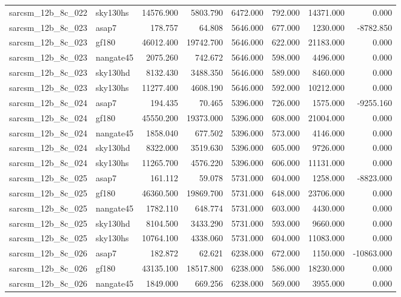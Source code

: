 \begin{tabular}{llrrrrrr}
sarcsm\_12b\_8c\_022 & sky130hs & 14576.900 & 5803.790 & 6472.000 & 792.000 & 14371.000 & 0.000 \\
sarcsm\_12b\_8c\_023 & asap7 & 178.757 & 64.808 & 5646.000 & 677.000 & 1230.000 & -8782.850 \\
sarcsm\_12b\_8c\_023 & gf180 & 46012.400 & 19742.700 & 5646.000 & 622.000 & 21183.000 & 0.000 \\
sarcsm\_12b\_8c\_023 & nangate45 & 2075.260 & 742.672 & 5646.000 & 598.000 & 4496.000 & 0.000 \\
sarcsm\_12b\_8c\_023 & sky130hd & 8132.430 & 3488.350 & 5646.000 & 589.000 & 8460.000 & 0.000 \\
sarcsm\_12b\_8c\_023 & sky130hs & 11277.400 & 4608.190 & 5646.000 & 592.000 & 10212.000 & 0.000 \\
sarcsm\_12b\_8c\_024 & asap7 & 194.435 & 70.465 & 5396.000 & 726.000 & 1575.000 & -9255.160 \\
sarcsm\_12b\_8c\_024 & gf180 & 45550.200 & 19373.000 & 5396.000 & 608.000 & 21004.000 & 0.000 \\
sarcsm\_12b\_8c\_024 & nangate45 & 1858.040 & 677.502 & 5396.000 & 573.000 & 4146.000 & 0.000 \\
sarcsm\_12b\_8c\_024 & sky130hd & 8322.000 & 3519.630 & 5396.000 & 605.000 & 9726.000 & 0.000 \\
sarcsm\_12b\_8c\_024 & sky130hs & 11265.700 & 4576.220 & 5396.000 & 606.000 & 11131.000 & 0.000 \\
sarcsm\_12b\_8c\_025 & asap7 & 161.112 & 59.078 & 5731.000 & 604.000 & 1258.000 & -8823.000 \\
sarcsm\_12b\_8c\_025 & gf180 & 46360.500 & 19869.700 & 5731.000 & 648.000 & 23706.000 & 0.000 \\
sarcsm\_12b\_8c\_025 & nangate45 & 1782.110 & 648.774 & 5731.000 & 603.000 & 4430.000 & 0.000 \\
sarcsm\_12b\_8c\_025 & sky130hd & 8104.500 & 3433.290 & 5731.000 & 593.000 & 9660.000 & 0.000 \\
sarcsm\_12b\_8c\_025 & sky130hs & 10764.100 & 4338.060 & 5731.000 & 604.000 & 11083.000 & 0.000 \\
sarcsm\_12b\_8c\_026 & asap7 & 182.872 & 62.621 & 6238.000 & 672.000 & 1150.000 & -10863.000 \\
sarcsm\_12b\_8c\_026 & gf180 & 43135.100 & 18517.800 & 6238.000 & 586.000 & 18230.000 & 0.000 \\
sarcsm\_12b\_8c\_026 & nangate45 & 1849.000 & 669.256 & 6238.000 & 569.000 & 3955.000 & 0.000 \\

\end{tabular}
